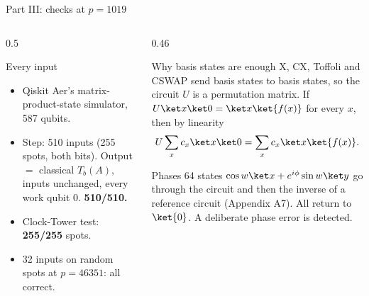 \documentclass[aspectratio=169,10pt]{beamer}
\begin{document}
\begin{frame}{Part III: checks at $p=1019$}
\begin{columns}[T]
\begin{column}{0.5\textwidth}
\begin{block}{Every input}
\small
\begin{itemize}
\item Qiskit Aer's matrix-product-state simulator, 587 qubits.
\item Step: 510 inputs (255 spots, both bits). Output $=$ classical $T_b(A)$, inputs unchanged, every work qubit 0. \textbf{510/510.}
\item Clock-Tower test: \textbf{255/255} spots.
\item 32 inputs on random spots at $p=46351$: all correct.
\end{itemize}
\end{block}
\end{column}
\begin{column}{0.46\textwidth}
\begin{block}{Why basis states are enough}
\small
X, CX, Toffoli and CSWAP send basis states to basis states, so the circuit $U$ is a permutation matrix. If $U\ket x\ket0=\ket x\ket{f(x)}$ for every $x$, then by linearity
\[ U\sum_x c_x\ket x\ket0=\sum_x c_x\ket x\ket{f(x)}. \]
\end{block}
\begin{block}{Phases}
\small
64 states $\cos w\ket x+e^{i\phi}\sin w\ket y$ go through the circuit and then the inverse of a reference circuit (Appendix A7). All return to $\ket{0}$. A deliberate phase error is detected.
\end{block}
\end{column}
\end{columns}
\end{frame}
\end{document}
